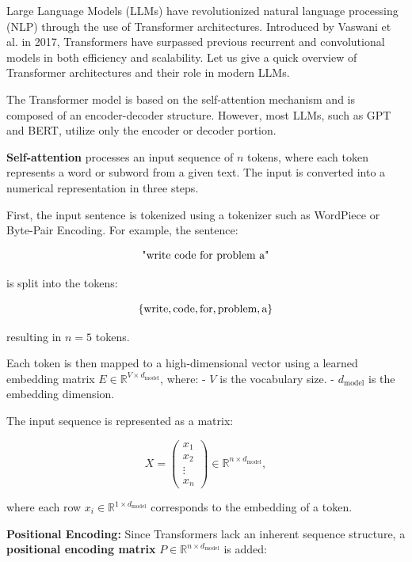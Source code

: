 Large Language Models (LLMs) have revolutionized natural language processing (NLP) through the use of Transformer architectures. Introduced by Vaswani et al. in 2017, Transformers have surpassed previous recurrent and convolutional models in both efficiency and scalability. Let us give a quick overview of Transformer architectures and their role in modern LLMs.

The Transformer model is based on the self-attention mechanism and is composed of an encoder-decoder structure. However, most LLMs, such as GPT and BERT, utilize only the encoder or decoder portion.

%

{\bf Self-attention} processes an input sequence of \( n \) tokens, where each token represents a word or subword from a given text. The input is converted into a numerical representation in three steps.

First, the input sentence is tokenized using a tokenizer such as WordPiece or Byte-Pair Encoding. For example, the sentence:

\[
\mbox{"write code for problem a"}
\]

is split into the tokens:

\[
\{\mbox{write}, \mbox{code}, \mbox{for}, \mbox{problem}, \mbox{a}\}
\]

resulting in \( n = 5 \) tokens.

Each token is then mapped to a high-dimensional vector using a learned embedding matrix \( E \in \mathbb{R}^{V \times d_{\text{model}}} \), where:
- \( V \) is the vocabulary size.
- \( d_{\text{model}} \) is the embedding dimension.

The input sequence is represented as a matrix:

\[
X = \left( \begin{array}{c} x_1 \\ x_2 \\ \vdots \\ x_n \end{array}\right) \in \mathbb{R}^{n \times d_{\text{model}}},
\]

where each row \( x_i \in \mathbb{R}^{1 \times d_{\text{model}}} \) corresponds to the embedding of a token.

\textbf{Positional Encoding:} Since Transformers lack an inherent sequence structure, a {\bf positional encoding matrix} \( P \in \mathbb{R}^{n \times d_{\text{model}}} \) is added:

